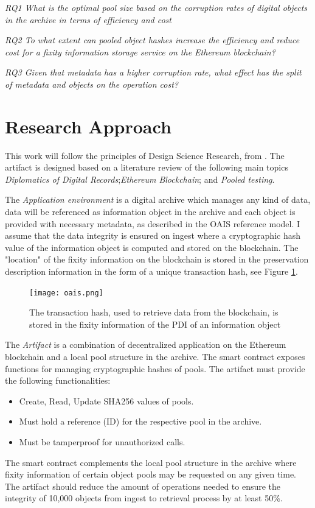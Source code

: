 \textit{RQ1 What is the optimal pool size based on the corruption rates of digital objects in the archive in terms of efficiency and cost}

\textit{RQ2 To what extent can pooled object hashes increase the efficiency and reduce cost for a fixity information storage service on the Ethereum blockchain?}

\textit{RQ3 Given that metadata has a higher corruption rate, what effect has the split of metadata and objects on the operation cost?}

\section{Research Approach}
\label{sec:approach}
This work will follow the principles of Design Science Research, from \cite{hevner2007three}. The artifact is designed based on a literature review of the following main topics \textit{Diplomatics of Digital Records};\textit{Ethereum Blockchain}; and \textit{Pooled testing}.

The \textit{Application environment} is a digital archive which manages any kind of data, data will be referenced as information object in the archive and each object is provided with necessary metadata, as described in the OAIS reference model. I assume that the data integrity is ensured on ingest where a cryptographic hash value of the information object is computed and stored on the blockchain. The "location" of the fixity information on the blockchain is stored in the preservation description information in the form of a unique transaction hash, see Figure \ref{fig:oais-fixity}. 

\begin{figure}[h]
  \caption{The transaction hash, used to retrieve data from the blockchain, is stored in the fixity information of the PDI of an information object \cite[7]{lee2010open}}
  \label{fig:oais-fixity}
  \centering
    \texttt{[image: oais.png]}
\end{figure}

The \textit{Artifact} is a combination of decentralized application on the Ethereum blockchain and a local pool structure in the archive. The smart contract exposes functions for managing cryptographic hashes of pools.
The artifact must provide the following functionalities:
\begin{itemize}
  \item Create, Read, Update SHA256 values of pools.
  \item Must hold a reference (ID) for the respective pool in the archive.
  \item Must be tamperproof for unauthorized calls.
\end{itemize}
The smart contract complements the local pool structure in the archive where fixity information of certain object pools may be requested on any given time. The artifact should reduce the amount of operations needed to ensure the integrity of 10,000 objects from ingest to retrieval process by at least 50\%.